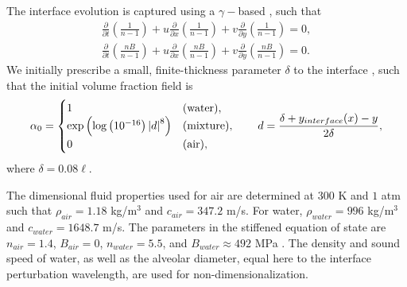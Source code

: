 \documentclass{jfm}%
\newcommand{\abs}[1]{\ensuremath{\left|#1\right|}}
\begin{document}
The interface evolution is captured using a $\gamma-$based
\citep{Shyue1998}, such that
\begin{subequations} \label{usbe_lung_eosvar_advection}%
  \begin{align}%
    \frac{\partial}{\partial t}\left(\frac{1}{n-1}\right)+u\frac{\partial}{\partial x}\left(\frac{1}{n-1}\right)+v\frac{\partial}{\partial y}\left(\frac{1}{n-1}\right) = 0,\\
    \frac{\partial}{\partial t}\left(\frac{n B}{n-1}\right)+u\frac{\partial}{\partial x}\left(\frac{n B}{n-1}\right)+v\frac{\partial}{\partial y}\left(\frac{n B}{n-1}\right) = 0.
  \end{align}%
\end{subequations}%
We initially prescribe a small, finite-thickness parameter $\delta$ to
the interface \citep{Latini2007}, such that the initial volume
fraction field is
\begin{align}
  \alpha_0 = %
  \begin{cases}
    1&$\text(water)$,\\%
    \exp\left(\log\left(10^{-16}\right)\abs{d}^8\right)&$\text(mixture)$,\\%
    0&$\text(air)$,%
  \end{cases} \qquad d = \frac{\delta +y_{interface}(x) -y}{2\delta},
\end{align}
where $\delta=0.08\ell$.

The dimensional fluid properties used for air are determined at $300$
K and $1$ atm such that $\rho_{air}=1.18$ kg/m$^3$ and $c_{air}=347.2$
m/s. For water, $\rho_{water}=996$ kg/m$^3$ and $c_{water}=1648.7$
m/s.  The parameters in the stiffened equation of state are
$n_{air}=1.4$, $B_{air} = 0$, $n_{water}=5.5$, and
$B_{water} \approx 492$ MPa
\citep{Marsh1980,holian1984t,Cocchi1996}. The density and sound speed
of water, as well as the alveolar diameter, equal here to the
interface perturbation wavelength, are used for non-dimensionalization.
\end{document}
